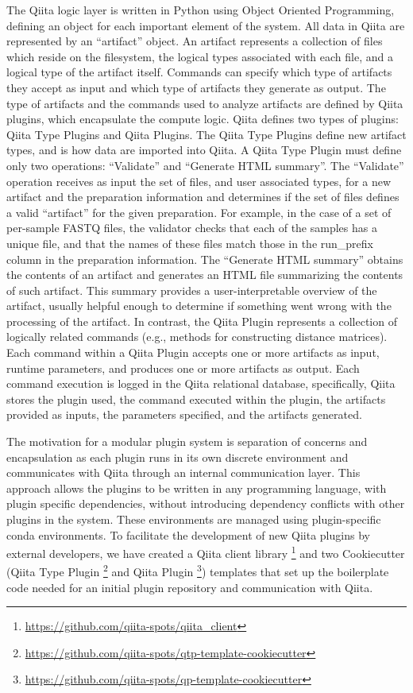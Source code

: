 The Qiita logic layer is written in Python using Object Oriented Programming,
defining an object for each important element of the system. All data in Qiita are
represented by an “artifact” object. An artifact represents a collection of files
which reside on the filesystem, the logical types associated with each file, and a
logical type of the artifact itself. Commands can specify which type of artifacts
they accept as input and which type of artifacts they generate as output. The
type of artifacts and the commands used to analyze artifacts are defined by Qiita
plugins, which encapsulate the compute logic. Qiita defines two types of plugins:
Qiita Type Plugins and Qiita Plugins. The Qiita Type Plugins define new artifact
types, and is how data are imported into Qiita. A Qiita Type Plugin must define
only two operations: “Validate” and “Generate HTML summary”. The “Validate” operation
receives as input the set of files, and user associated types, for a new artifact
and the preparation information and determines if the set of files defines a valid
“artifact” for the given preparation. For example, in the case of a set of per-sample
FASTQ files, the validator checks that each of the samples has a unique file,
and that the names of these files match those in the run\_prefix column in the
preparation information. The “Generate HTML summary” obtains the contents of an
artifact and generates an HTML file summarizing the contents of such artifact.
This summary provides a user-interpretable overview of the artifact, usually
helpful enough to determine if something went wrong with the processing of the
artifact. In contrast, the Qiita Plugin represents a collection of logically
related commands (e.g., methods for constructing distance matrices). Each command
within a Qiita Plugin accepts one or more artifacts as input, runtime parameters,
and produces one or more artifacts as output. Each command execution is logged in
the Qiita relational database, specifically, Qiita stores the plugin used, the
command executed within the plugin, the artifacts provided as inputs, the parameters
specified, and the artifacts generated.

The motivation for a modular plugin system is separation of concerns and
encapsulation as each plugin runs in its own discrete environment and communicates
with Qiita through an internal communication layer. This approach allows the plugins
to be written in any programming language, with plugin specific dependencies, without
introducing dependency conflicts with other plugins in the system. These environments
are managed using plugin-specific conda environments. To facilitate the development
of new Qiita plugins by external developers, we have created a Qiita client
library \footnote{\url{https://github.com/qiita-spots/qiita_client}} and two
Cookiecutter (Qiita Type Plugin \footnote{\url{https://github.com/qiita-spots/qtp-template-cookiecutter}}
and Qiita Plugin \footnote{\url{https://github.com/qiita-spots/qp-template-cookiecutter}})
templates that set up the boilerplate code needed for an initial plugin repository and communication with Qiita.

